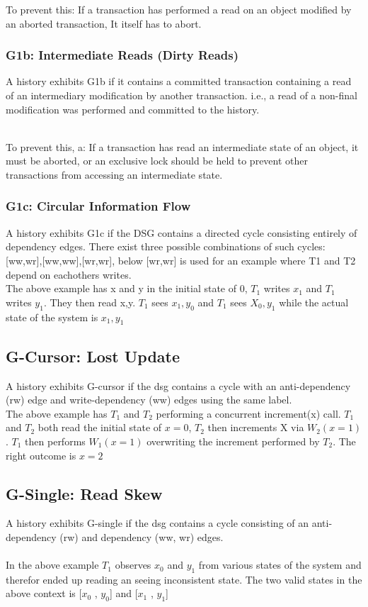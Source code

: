 \documentclass[a4paper,10pt,titlepage]{report}
\begin{document}
To prevent this: If a transaction has performed a read on an object modified by an aborted transaction, It itself has to abort.
\subsubsection{G1b: Intermediate Reads (Dirty Reads)}
    A history exhibits G1b if it contains a committed transaction containing a read of an intermediary modification by another transaction. i.e., a read of a non-final modification was performed and committed to the history. 

 \\
To prevent this, a: If a transaction has read an intermediate state of an object, it must be aborted, or an exclusive lock should be held to prevent other transactions from accessing an intermediate state.


\subsubsection{G1c: Circular Information Flow}
A history exhibits G1c if the DSG contains a directed cycle consisting entirely of dependency edges. There exist three possible combinations of such cycles: [ww,wr],[ww,ww],[wr,wr], below [wr,wr] is used for an example where T1 and T2 depend on eachothers writes.\\


The above example has x and y in the initial state of 0, $T_1$ writes $x_1$ and $T_1$ writes $y_1$. They then read x,y. $T_1$ sees $x_1,y_0$ and $T_1$ sees $X_0,y_1$ while the actual state of the system is $x_1,y_1$


\subsection{G-Cursor: Lost Update}
A history exhibits G-cursor if the dsg contains a cycle with an anti-dependency (rw) edge and write-dependency (ww) edges using the same label.\\


The above example has $T_1$ and $T_2$ performing a concurrent increment(x) call. $T_1$ and $T_2$ both read the initial state of $x=0$, $T_2$ then increments X via $W_2(x=1)$. $T_1$ then performs $W_1(x=1)$ overwriting the increment performed by $T_2$. The right outcome is $x = 2$

\subsection{G-Single: Read Skew}
A history exhibits G-single if the dsg contains a cycle consisting of an anti-dependency (rw) and dependency (ww, wr) edges.\\

\\
In the above example $T_1$ observes $x_0$ and $y_1$ from various states of the system and therefor ended up reading an seeing inconsistent state. The two valid states in the above context is [$x_0$ , $y_0$] and [$x_1$ , $y_1$]
\end{document}

